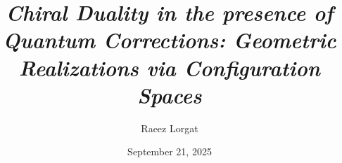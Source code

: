 \documentclass[11pt]{memoir}
\title{\textit{Chiral Duality in the presence of Quantum Corrections: Geometric Realizations via Configuration Spaces}}
\author{Raeez Lorgat}
\date{September 21, 2025}
\newcommand{\ConfigSpace}[1]{\overline{C}_{#1}(X)}
\newcommand{\LogForm}[2]{\eta_{#1#2}}
\begin{document}
\newcommand{\barBgeom}{\bar{\mathbf{B}}}
\newcommand{\barBch}{\bar{B}^{\text{ch}}}       %
\newcommand{\Omegach}{\Omega^{\text{ch}}}       %
\newcommand{\ConfigSpace}[1]{\overline{C}_{#1}(X)}  %
\newcommand{\LogForm}[2]{\eta_{#1#2}}           %
\newcommand{\OPEcoeff}[4]{C_{#1#2}^{#3,#4}}    %
\newcommand{\ChirAlg}{\mathsf{ChirAlg}}         %
\newcommand{\dgCoalg}{\mathsf{dgCoalg}}         %

\newcommand{\ChirHoch}{CH}                      %
\newcommand{\Wakimoto}{\mathcal{M}_{\text{Wak}}} %
\newcommand{\Walg}{\mathcal{W}}                 %
\newcommand{\critLevel}{-h^\vee}                %
\newcommand{\PrimeForm}{E}                      %
\newcommand{\ThetaChar}{\vartheta}              %
\newcommand{\ModularParam}{\tau}                %
\newcommand{\DS}{\text{DS}}                     %




\maketitle
 
\end{document}
